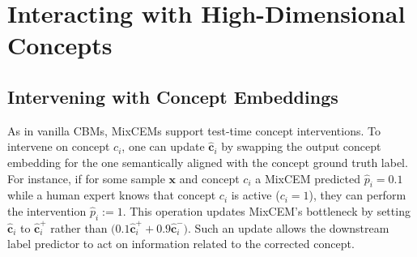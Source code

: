 


\section{Interacting with High-Dimensional Concepts}

\subsection{Intervening with Concept Embeddings}
As in vanilla CBMs, MixCEMs support test-time concept interventions. To intervene on concept $c_i$, one can update $\hat{\mathbf{c}}_i$ by swapping the output concept embedding for the one semantically aligned with the concept ground truth label. For instance, if for some sample $\mathbf{x}$ and concept $c_i$ a MixCEM predicted $\hat{p}_i = 0.1$ while a human expert knows that concept $c_i$ is active ($c_i=1$), they can perform the intervention $\hat{p}_i := 1$. This operation updates MixCEM's bottleneck by setting $\hat{\mathbf{c}}_i$ to $\hat{\mathbf{c}}^+_i$ rather than $\big(0.1 \hat{\mathbf{c}}^+_i + 0.9 \hat{\mathbf{c}}^-_i\big)$. Such an update allows the downstream label predictor to act on information related to the corrected concept.

